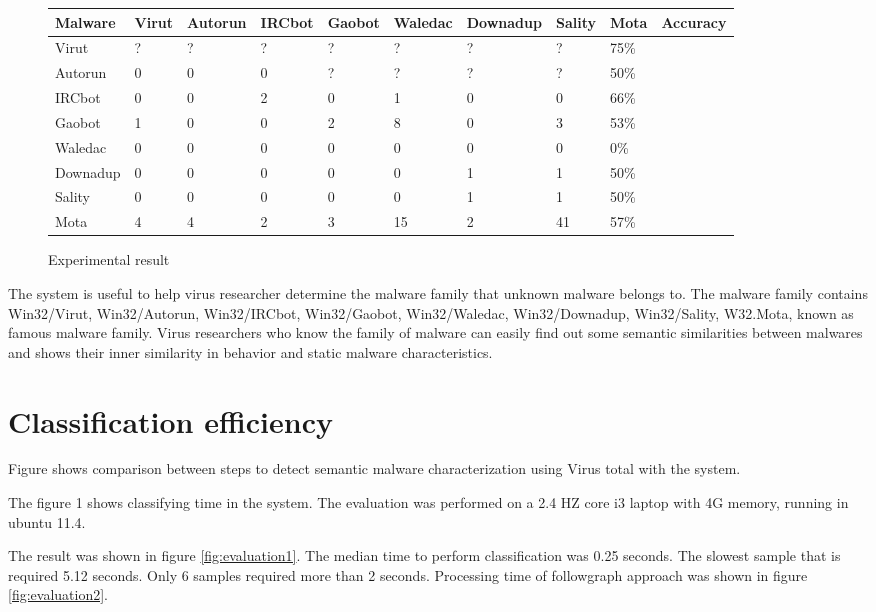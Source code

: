 \begin{figure}[h!]
  \begin{center}
    \begin{tabular}{ | l | l | l | l | l | l | l | l | l | l |}
     \hline
    Malware & Virut & Autorun & IRCbot & Gaobot & Waledac & Downadup & Sality & Mota & Accuracy\\ \hline
    Virut & ? & ? & ? & ? & ? & ? & ? & 75\% \\ \hline
	Autorun & 0 & 0 & 0 & ? & ? & ? & ? & 50\% \\ \hline
	IRCbot & 0 & 0 & 2 & 0 & 1 & 0 & 0 & 66\% \\ \hline
	Gaobot & 1 & 0 & 0 & 2 & 8 & 0 & 3 & 53\% \\ \hline
	Waledac & 0 & 0 & 0 & 0 & 0 & 0 & 0 & 0\% \\ \hline
	Downadup & 0 & 0 & 0 & 0 & 0 & 1 & 1 & 50\% \\ \hline
	Sality & 0 & 0 & 0 & 0 & 0 & 1 & 1 & 50\% \\ \hline
	Mota & 4 & 4 & 2 & 3 & 15 & 2 & 41 & 57\% \\ \hline

    \end{tabular}
	\end{center}
     \caption{Experimental result}
    \label{fig:experimentalresult}
\end{figure} 

The system is useful to help virus researcher determine the malware family that unknown malware belongs to. The malware family contains Win32/Virut, Win32/Autorun, Win32/IRCbot, Win32/Gaobot, Win32/Waledac, Win32/Downadup, Win32/Sality, W32.Mota, known as famous malware family. Virus researchers who know the family of malware can easily find out some semantic similarities between malwares and shows their inner similarity in behavior and static malware characteristics.

\section{Classification efficiency}
Figure shows comparison between steps to detect semantic malware characterization using Virus total with the system.

The figure 1 shows classifying time in the system. The evaluation was performed on a 2.4 HZ core i3 laptop with 4G memory, running in ubuntu 11.4. 	

The result was shown in figure \ref{fig:evaluation1}. The median time to perform classification was 0.25 seconds. The slowest sample that is required 5.12 seconds. Only 6 samples required more than 2 seconds. Processing time of followgraph approach was shown in figure \ref{fig:evaluation2}.


